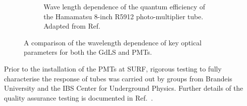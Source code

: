 \begin{figure}[!ht]
\begin{subfigure}{0.47\textwidth}
         \caption{Wave length dependence of the quantum efficiency of the Hamamatsu 8-inch R5912 photo-multiplier tube. Adapted from Ref.~\cite{HamamatsuR5912}}
         \label{fig:LZ/ODPMTQE}
     \end{subfigure}
     \caption[A comparison of the wavelength dependence of key optical parameters for both the GdLS and PMTs.]{A comparison of the wavelength dependence of key optical parameters for both the GdLS and PMTs.}
     \label{fig:LZ/ODPMTSpecRes}
\end{figure}
Prior to the installation of the PMTs at SURF, rigorous testing to fully characterise the response of tubes was carried out by groups from Brandeis University and the IBS Center for Underground Physics. Further details of the quality assurance testing is documented in Ref.~\cite{lkorley:thesis}.

